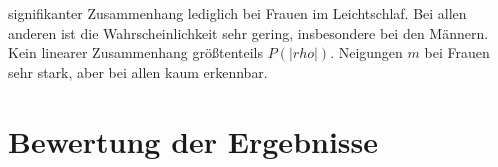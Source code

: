 signifikanter Zusammenhang lediglich bei Frauen im Leichtschlaf. Bei allen anderen ist die Wahrscheinlichkeit sehr gering, insbesondere bei den Männern. Kein linearer Zusammenhang größtenteils $P(|rho|)$. Neigungen $m$ bei Frauen sehr stark, aber bei allen kaum erkennbar.







\section{Bewertung der Ergebnisse}


